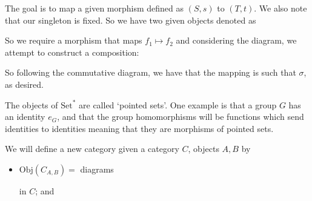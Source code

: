\documentclass{report}
\begin{document}
\begin{examples}
\begin{example}[\label{exm:1.3.8}]
\begin{itemize}
                The goal is to map a given morphism defined as $(S, s)$ to $(T, t)$. We also note that our singleton is fixed. So we have two given objects denoted as 
                \begin{center}
                \end{center}
                So we require a morphism that maps $f_{1} \mapsto f_{2}$ and considering the diagram, we attempt to construct a composition:
                \begin{center}
                \end{center}
                So following the commutative diagram, we have that the mapping is such that $\sigma$, as desired.
            \end{itemize}
            The objects of $\text{Set}^{*}$ are called `pointed sets'. One example is that a group $G$ has an identity $e_{G}$, and that the group homomorphisms will be functions which send identities to identities meaning that they are morphisms of pointed sets.
    \end{example}

    \begin{example}[\label{exm:1.3.9}]
        We will define a new category given a category $C$, objects $A, B$ by
            \begin{itemize}
                \item $\text{Obj}(C_{A, B}) = $ diagrams
                    \begin{center}
                    \end{center}
                    in $C$; and


\end{itemize}
\end{example}
\end{examples}
\end{document}
